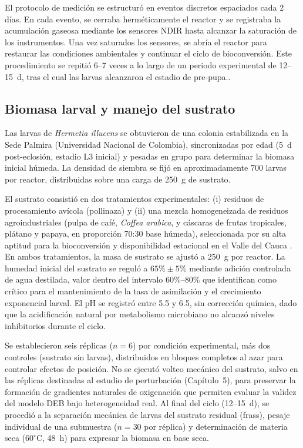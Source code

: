 El protocolo de medición se estructuró en eventos discretos espaciados cada 2 días. 
En cada evento, se cerraba herméticamente el reactor y se registraba la acumulación gaseosa mediante los sensores NDIR hasta alcanzar la saturación de los instrumentos. 
Una vez saturados los sensores, se abría el reactor para restaurar las condiciones ambientales y continuar el ciclo de bioconversión. 
Este procedimiento se repitió 6--7 veces a lo largo de un periodo experimental de 12--\SI{15}{\day}, tras el cual las larvas alcanzaron el estadio de pre-pupa..

\subsection{Biomasa larval y manejo del sustrato}
\label{subsec:cap2_biomassa_sustrato}

Las larvas de \emph{Hermetia illucens} se obtuvieron de una colonia estabilizada en la Sede Palmira (Universidad Nacional de Colombia), sincronizadas por edad (5~d post-eclosión, estadio L3 inicial) y pesadas en grupo para determinar la biomasa inicial húmeda. 
La densidad de siembra se fijó en aproximadamente 700 larvas por reactor, distribuidas sobre una carga de \SI{250}{\gram} de sustrato. 

El sustrato consistió en dos tratamientos experimentales: (i) residuos de procesamiento avícola (pollinaza) y (ii) una mezcla homogeneizada de residuos agroindustriales (pulpa de café, \emph{Coffea arabica}, y cáscaras de frutas tropicales, plátano y papaya, en proporción 70:30 base húmeda), seleccionada por su alta aptitud para la bioconversión y disponibilidad estacional en el Valle del Cauca \parencite{brunoValorizationOrganicWaste2025}. 
En ambos tratamientos, la masa de sustrato se ajustó a \SI{250}{\gram} por reactor. 
La humedad inicial del sustrato se reguló a $65\%\pm5\%$ mediante adición controlada de agua destilada, valor dentro del intervalo 60\%--80\% que \textcite{bekkerImpactSubstrateMoisture2021a} identifican como crítico para el mantenimiento de la tasa de asimilación y el crecimiento exponencial larval. 
El pH se registró entre 5.5 y 6.5, sin corrección química, dado que la acidificación natural por metabolismo microbiano no alcanzó niveles inhibitorios durante el ciclo.

Se establecieron seis réplicas ($n = 6$) por condición experimental, más dos controles (sustrato sin larvas), distribuidos en bloques completos al azar para controlar efectos de posición. 
No se ejecutó volteo mecánico del sustrato, salvo en las réplicas destinadas al estudio de perturbación (Capítulo~5), para preservar la formación de gradientes naturales de oxigenación que permiten evaluar la validez del modelo DEB bajo heterogeneidad real. 
Al final del ciclo (12--\SI{15}{\day}), se procedió a la separación mecánica de larvas del sustrato residual (frass), pesaje individual de una submuestra ($n=30$ por réplica) y determinación de materia seca ($60^{\circ}$C, 48~h) para expresar la biomasa en base seca.